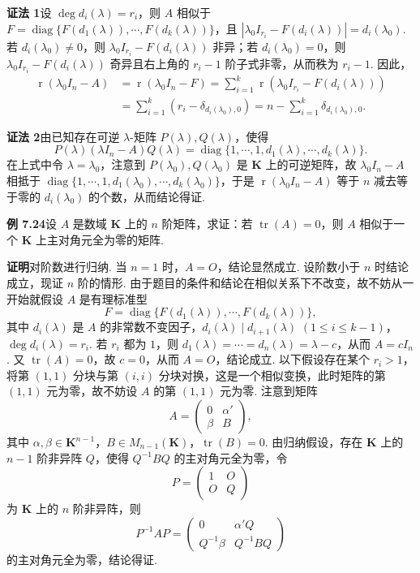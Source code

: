 \documentclass[UTF8,12pt,a4paper,fontset=fandol]{ctexart}
\begin{document}
\noindent\textbf{证法 1}\quad 设 $\deg d_i(\lambda)=r_i$，则 $A$ 相似于 $F=\operatorname{diag}\{F(d_1(\lambda)),\cdots,F(d_k(\lambda))\}$，且 $|\lambda_0I_{r_i}-F(d_i(\lambda))|=d_i(\lambda_0)$. 若 $d_i(\lambda_0)\ne 0$，则 $\lambda_0I_{r_i}-F(d_i(\lambda))$ 非异；若 $d_i(\lambda_0)=0$，则 $\lambda_0I_{r_i}-F(d_i(\lambda))$ 奇异且右上角的 $r_i-1$ 阶子式非零，从而秩为 $r_i-1$. 因此，
\[
\begin{aligned}
\operatorname{r}(\lambda_0I_n-A)
&=\operatorname{r}(\lambda_0I_n-F)
=\sum_{i=1}^k\operatorname{r}(\lambda_0I_{r_i}-F(d_i(\lambda)))\\
&=\sum_{i=1}^k(r_i-\delta_{d_i(\lambda_0),0})
=n-\sum_{i=1}^k\delta_{d_i(\lambda_0),0}.
\end{aligned}
\]

\noindent\textbf{证法 2}\quad 由已知存在可逆 $\lambda$-矩阵 $P(\lambda),Q(\lambda)$，使得
\[
P(\lambda)(\lambda I_n-A)Q(\lambda)=\operatorname{diag}\{1,\cdots,1,d_1(\lambda),\cdots,d_k(\lambda)\}.
\]
在上式中令 $\lambda=\lambda_0$，注意到 $P(\lambda_0),Q(\lambda_0)$ 是 $\mathbf{K}$ 上的可逆矩阵，故 $\lambda_0I_n-A$ 相抵于 $\operatorname{diag}\{1,\cdots,1,d_1(\lambda_0),\cdots,d_k(\lambda_0)\}$，于是 $\operatorname{r}(\lambda_0I_n-A)$ 等于 $n$ 减去等于零的 $d_i(\lambda_0)$ 的个数，从而结论得证.

\noindent\textbf{例 7.24}\quad 设 $A$ 是数域 $\mathbf{K}$ 上的 $n$ 阶矩阵，求证：若 $\operatorname{tr}(A)=0$，则 $A$ 相似于一个 $\mathbf{K}$ 上主对角元全为零的矩阵.

\noindent\textbf{证明}\quad 对阶数进行归纳. 当 $n=1$ 时，$A=O$，结论显然成立. 设阶数小于 $n$ 时结论成立，现证 $n$ 阶的情形. 由于题目的条件和结论在相似关系下不改变，故不妨从一开始就假设 $A$ 是有理标准型
\[
F=\operatorname{diag}\{F(d_1(\lambda)),\cdots,F(d_k(\lambda))\},
\]
其中 $d_i(\lambda)$ 是 $A$ 的非常数不变因子，$d_i(\lambda)\mid d_{i+1}(\lambda)$ $(1\le i\le k-1)$，$\deg d_i(\lambda)=r_i$. 若 $r_i$ 都为 $1$，则 $d_1(\lambda)=\cdots=d_n(\lambda)=\lambda-c$，从而 $A=cI_n$. 又 $\operatorname{tr}(A)=0$，故 $c=0$，从而 $A=O$，结论成立. 以下假设存在某个 $r_i>1$，将第 $(1,1)$ 分块与第 $(i,i)$ 分块对换，这是一个相似变换，此时矩阵的第 $(1,1)$ 元为零，故不妨设 $A$ 的第 $(1,1)$ 元为零. 注意到矩阵
\[
A=\left(\begin{array}{cc}
0 & \alpha'\\
\beta & B
\end{array}\right),
\]
其中 $\alpha,\beta\in\mathbf{K}^{n-1}$，$B\in M_{n-1}(\mathbf{K})$，$\operatorname{tr}(B)=0$. 由归纳假设，存在 $\mathbf{K}$ 上的 $n-1$ 阶非异阵 $Q$，使得 $Q^{-1}BQ$ 的主对角元全为零，令
\[
P=\left(\begin{array}{cc}
1 & O\\
O & Q
\end{array}\right)
\]
为 $\mathbf{K}$ 上的 $n$ 阶非异阵，则
\[
P^{-1}AP=
\left(\begin{array}{cc}
0 & \alpha'Q\\
Q^{-1}\beta & Q^{-1}BQ
\end{array}\right)
\]
的主对角元全为零，结论得证.
\end{document}
